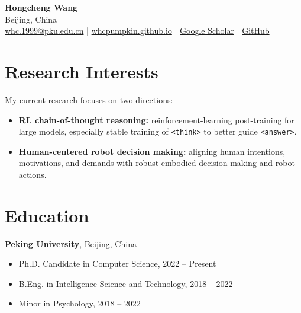 \documentclass[a4paper,10pt]{article}
\begin{document}
\pagestyle{empty}

\begin{center}
{\LARGE \textbf{Hongcheng Wang}}\\[4pt]
Beijing, China \\ 
\href{mailto:whc.1999@pku.edu.cn}{whc.1999@pku.edu.cn} \;|\;
\href{https://whcpumpkin.github.io}{whcpumpkin.github.io} \;|\;
\href{https://scholar.google.com/citations?user=Och47hYAAAAJ&hl=zh-CN}{Google Scholar} \;|\;
\href{https://github.com/whcpumpkin}{GitHub}
\end{center}

\section*{Research Interests}
My current research focuses on two directions:
\begin{itemize}
    \item \textbf{RL chain-of-thought reasoning:} reinforcement-learning post-training for large models, especially stable training of \texttt{<think>} to better guide \texttt{<answer>}.
    \item \textbf{Human-centered robot decision making:} aligning human intentions, motivations, and demands with robust embodied decision making and robot actions.
\end{itemize}

\section*{Education}
\textbf{Peking University}, Beijing, China
\begin{itemize}
    \item Ph.D. Candidate in Computer Science, 2022 -- Present
    \item B.Eng. in Intelligence Science and Technology, 2018 -- 2022
    \item Minor in Psychology, 2018 -- 2022
\end{itemize}
\end{document}
